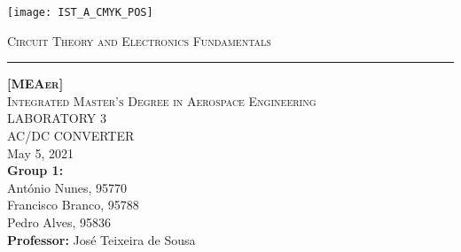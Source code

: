 \thispagestyle {empty}

\begin{titlepage}

\texttt{[image: IST\_A\_CMYK\_POS]} \\[1cm]

\centering

\textsc{\large{Circuit Theory and Electronics Fundamentals}} \\[0.25cm]
\hrule
\vspace{1.75cm}

\textsc{\textbf {[MEAer]}} \\[0.5cm]
\textsc{Integrated Master's Degree in Aerospace Engineering} \\[3.25cm]
\MakeUppercase{\Huge Laboratory 3} \\[0.75cm]
\MakeUppercase{\huge AC/DC Converter} \\[3.5cm]
May 5, 2021 \\[2.5cm]
\textbf{Group 1:} \\[0.5cm]
António Nunes, 95770 \\
Francisco Branco, 95788 \\
Pedro Alves, 95836 \\[2cm]
\textbf{Professor:} José Teixeira de Sousa 
\end{titlepage}
